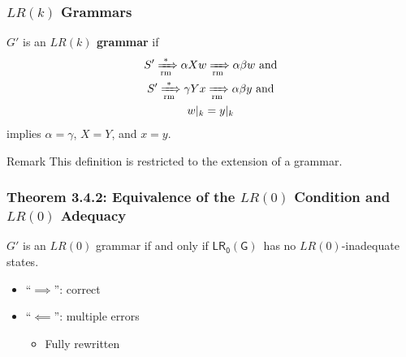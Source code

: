\documentclass{beamer}
\newcommand{\concept}[1]{\textbf{#1}}
\newcommand{\derivera}{\ensuremath{\xRightarrow[\mathrm{rm}]{}}}
\newcommand{\deriversa}{\ensuremath{\xRightarrow[\mathrm{rm}]{*}}}
\newcommand{\derivers}[2]{\ensuremath{{#1} \deriversa {#2}}}
\newcommand{\lrdfa}{\ensuremath{\mathsf{LR_0(G)}}}
\begin{document}
\begin{frame}
  \frametitle{$LR(k)$ Grammars}
  \begin{definition}[$LR(k)$ Grammar]
    $G'$ is an \concept{$LR(k)$ grammar} if 
    \begin{gather*}
      \derivers{S'}{\alpha X w} \derivera \alpha \beta w \text{ and}\\
      \derivers{S'}{\gamma Y x} \derivera \alpha \beta y \text{ and}\\
      w|_k = y|_k
    \end{gather*}
    implies $\alpha = \gamma$, $X = Y$, and $x = y$.
  \end{definition}
  \begin{alertblock}{Remark}
    This definition is restricted to the extension of a grammar.
  \end{alertblock}
\end{frame}

\begin{frame}
  \frametitle{Theorem 3.4.2: Equivalence of the $LR(0)$ Condition and
    $LR(0)$ Adequacy}
  \begin{theorem}\label{lr0_iff_no_inad}
    $G'$ is an $LR(0)$ grammar if and only if \lrdfa\ has no $LR(0)$-inadequate states.
  \end{theorem}
  \begin{itemize}
    \item ``$\implies$'': correct
    \item ``$\impliedby$'': multiple errors
    \begin{itemize}
      \item Fully rewritten
    \end{itemize}
  \end{itemize}
\end{frame}
\end{document}
